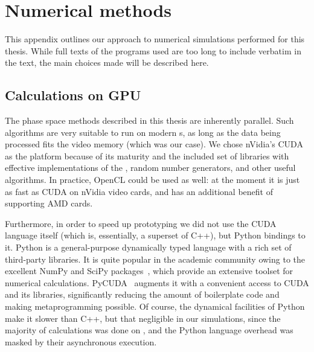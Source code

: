 \chapter{Numerical methods}
\label{cha:appendix:numerical}

This appendix outlines our approach to numerical simulations performed for this thesis.
While full texts of the programs used are too long to include verbatim in the text, the main choices made will be described here.


\section{Calculations on GPU}

The phase space methods described in this thesis are inherently parallel.
Such algorithms are very suitable to run on modern s, as long as the data being processed fits the video memory (which was our case).
We chose nVidia's CUDA as the  platform because of its maturity and the included set of libraries with effective implementations of the , random number generators, and other useful algorithms.
In practice, OpenCL could be used as well: at the moment it is just as fast as CUDA on nVidia video cards, and has an additional benefit of supporting AMD cards.

Furthermore, in order to speed up prototyping we did not use the CUDA language itself (which is, essentially, a superset of C++), but Python bindings to it.
Python is a general-purpose dynamically typed language with a rich set of third-party libraries.
It is quite popular in the academic community owing to the excellent NumPy and SciPy packages~\cite{Oliphant2007}, which provide an extensive toolset for numerical calculations.
PyCUDA~\cite{Klockner2012} augments it with a convenient access to CUDA and its libraries, significantly reducing the amount of boilerplate code and making metaprogramming possible.
Of course, the dynamical facilities of Python make it slower than C++, but that negligible in our simulations, since the majority of calculations was done on , and the Python language overhead was masked by their asynchronous execution.


